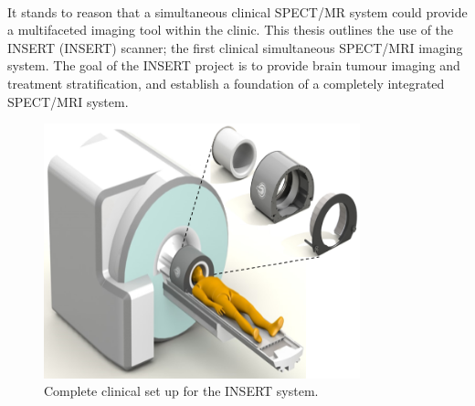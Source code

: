 \paragraph{}
It stands to reason that a simultaneous clinical \acrshort{SPECT/MR} system could provide a multifaceted imaging tool within the clinic. This thesis outlines the use of the \acrlong{INSERT} (\acrshort{INSERT}) scanner; the first clinical simultaneous \acrshort{SPECT/MRI} imaging system. The goal of the \acrshort{INSERT} project is to provide brain tumour imaging and treatment stratification, and establish a foundation of a completely integrated \acrshort{SPECT/MRI} system. 

\begin{figure}[!t]
\centering
\includegraphics[width=3.6in]{figures/INSERT_clinical.png}

\caption{Complete clinical set up for the \acrshort{INSERT} system.}
\label{fig_INSERT}
\end{figure}
